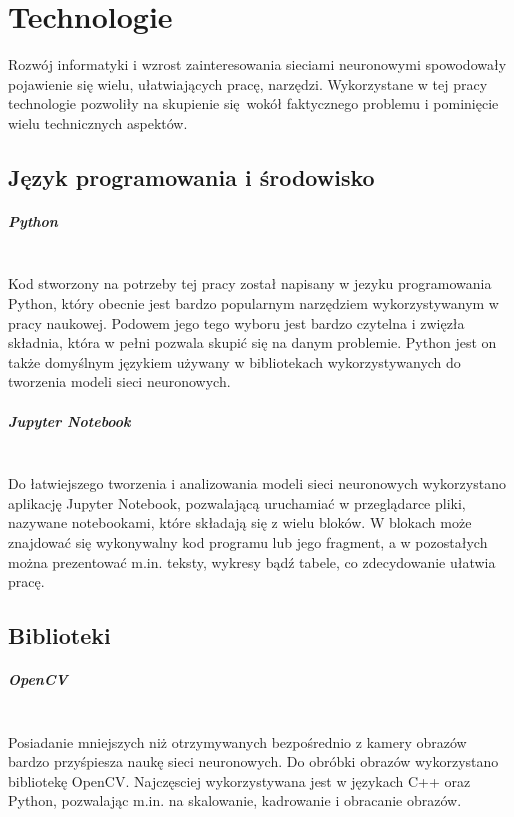 
\chapter{Technologie}
Rozwój informatyki i wzrost zainteresowania sieciami neuronowymi spowodowały pojawienie
się wielu, ułatwiających pracę, narzędzi. Wykorzystane w tej pracy technologie
pozwoliły na skupienie się wokół faktycznego problemu i pominięcie wielu technicznych
aspektów.

\section{Język programowania i środowisko}

\paragraph{Python} \mbox{}\\
Kod stworzony na potrzeby tej pracy został napisany w jezyku programowania Python, który
obecnie jest bardzo popularnym narzędziem wykorzystywanym w pracy naukowej.
Podowem jego tego wyboru jest bardzo czytelna i zwięzła składnia,
która w pełni pozwala skupić się na danym problemie. Python jest on także domyślnym
językiem używany w bibliotekach wykorzystywanych do tworzenia modeli sieci neuronowych.

\paragraph{Jupyter Notebook} \mbox{}\\
Do łatwiejszego tworzenia i analizowania modeli sieci neuronowych wykorzystano aplikację
Jupyter Notebook, pozwalającą uruchamiać w przeglądarce pliki, nazywane notebookami,
które składają się z wielu bloków. W blokach może znajdować się wykonywalny kod programu
lub jego fragment, a w pozostałych można prezentować m.in. teksty, wykresy bądź tabele,
co zdecydowanie ułatwia pracę.\\

\section{Biblioteki}

\paragraph{OpenCV} \mbox{}\\
Posiadanie mniejszych niż otrzymywanych bezpośrednio z kamery obrazów bardzo przyśpiesza
naukę sieci neuronowych. Do obróbki obrazów wykorzystano bibliotekę OpenCV.
Najczęsciej wykorzystywana jest w językach C++ oraz Python, pozwalając m.in. na
skalowanie, kadrowanie i obracanie obrazów.


